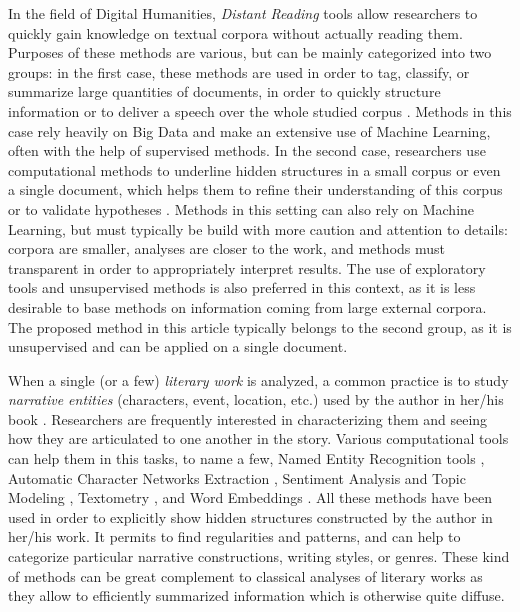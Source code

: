 \documentclass[
twocolumn,
]{ceurart}
\begin{document}
In the field of Digital Humanities, \emph{Distant Reading} tools \cite{Moretti2014} allow researchers to quickly gain knowledge on textual corpora without actually reading them. Purposes of these methods are various, but can be mainly categorized into two groups: in the first case, these methods are used in order to tag, classify, or summarize large quantities of documents, in order to quickly structure information or to deliver a speech over the whole studied corpus \cite{Underwood2017}. Methods in this case rely heavily on Big Data and make an extensive use of Machine Learning, often with the help of supervised methods. In the second case, researchers use computational methods to underline hidden structures in a small corpus or even a single document, which helps them to refine their understanding of this corpus or to validate hypotheses \cite{Eve2017}. Methods in this setting can also rely on Machine Learning, but must typically be build with more caution and attention to details: corpora are smaller, analyses are closer to the work, and methods must transparent in order to appropriately interpret results. The use of exploratory tools and unsupervised methods is also preferred in this context, as it is less desirable to base methods on information coming from large external corpora. The proposed method in this article typically belongs to the second group, as it is unsupervised and can be applied on a single document.

When a single (or a few) \emph{literary work} is analyzed, a common practice is to study \emph{narrative entities} (characters, event, location, etc.) used by the author in her/his book \cite{Schmid2010}. Researchers are frequently interested in characterizing them and seeing how they are articulated to one another in the story. Various computational tools can help them in this tasks, to name a few, Named Entity Recognition tools \cite{Agarwal2013, Chaturvedi2017, Li2022}, Automatic Character Networks Extraction \cite{Labatut2019}, Sentiment Analysis and Topic Modeling \cite{Min2019}, Textometry \cite{Novakova2019}, and Word Embeddings \cite{Grayson2016, Heuser2017, Kerr2017}. All these methods have been used in order to explicitly show hidden structures constructed by the author in her/his work. It permits to find regularities and patterns, and can help to categorize particular narrative constructions, writing styles, or genres. These kind of methods can be great complement to classical analyses of literary works as they allow to efficiently summarized information which is otherwise quite diffuse.
\end{document}
